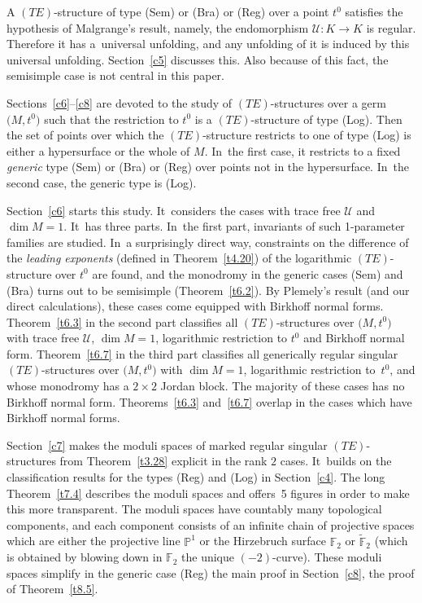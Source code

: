 \documentclass[pdftex]{sigma}%
\numberwithin{equation}{section}
\numberwithin{figure}{section}
\renewcommand{\P}{{\mathbb P}}
\newcommand{\F}{{\mathbb F}}
\newcommand{\UU}{{\mathcal U}}
\newcommand{\www}{\widetilde}
\begin{document}
A $(TE)$-structure of type (Sem) or (Bra) or (Reg) over
a point $t^0$ satisfies the hypothesis of Malgrange's result,
namely, the endomorphism $\UU\colon K\to K$ is regular. Therefore it
has a~uni\-ver\-sal unfolding, and any unfolding of it is
induced by this universal unfolding. %
Section~\ref{c5} discusses this.
Also because of this fact, the semisimple case is not
central in this paper.

Sections~\ref{c6}--\ref{c8} are devoted to the study
of $(TE)$-structures over a germ $\big(M,t^0\big)$ such that
the restriction to $t^0$ is a $(TE)$-structure of type (Log).
Then the set of points over which the $(TE)$-structure
restricts to one of type (Log) is either a hypersurface or
the whole of $M$. In~the first case, it restricts to a fixed
{\it generic} type (Sem) or (Bra) or (Reg) over points
not in the hypersurface. In~the second case, the generic
type is (Log).

Section~\ref{c6} starts this study. It~considers the
cases with trace free $\UU$ and $\dim M=1$. It~has three parts. In~the first part, invariants of
such 1-parameter families are studied. In~a surprisingly
direct way, constraints on the difference of the
{\it leading exponents} (defined in Theorem~\ref{t4.20})
of the logarithmic $(TE)$-structure over $t^0$ are found,
and the monodromy in the generic cases (Sem) and (Bra) turns
out to be semisimple (Theorem~\ref{t6.2}).
By Plemely's result (and our direct calculations),
these cases come equipped with Birkhoff normal forms.
Theorem~\ref{t6.3} in the second part
classifies all $(TE)$-structures over $\big(M,t^0\big)$ with
trace free $\UU$, $\dim M=1$, logarithmic restriction to $t^0$
and Birkhoff normal form.
Theorem~\ref{t6.7} in the third part classifies all
generically regular singular $(TE)$-structures over $\big(M,t^0\big)$
with $\dim M=1$, logarithmic restriction to~$t^0$, and
whose monodromy has a $2\times 2$ Jordan block.
The majority of these cases has no Birkhoff normal
form. Theorems~\ref{t6.3} and~\ref{t6.7} overlap
in the cases which have Birkhoff normal forms.

Section~\ref{c7} makes the moduli spaces of marked regular
singular $(TE)$-structures from Theorem~\ref{t3.28}
explicit in the rank $2$ cases. It~builds on the classification
results for the types (Reg) and (Log) in Section~\ref{c4}.
The long Theorem~\ref{t7.4} describes the moduli spaces
and offers~5 figures in order to make this more transparent.
The moduli spaces have countably many topological components,
and each component consists of an infinite chain of
projective spaces which are either the projective line $\P^1$
or the Hirzebruch surface $\F_2$ or $\www\F_2$ (which is
obtained by blowing down in $\F_2$ the unique $(-2)$-curve).
These moduli spaces simplify in the generic case (Reg)
the main proof in Section~\ref{c8}, the proof of Theorem~\ref{t8.5}.
\end{document}
